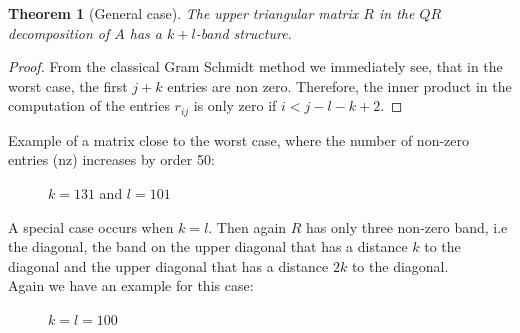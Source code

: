 \documentclass{report}
\numberwithin{pic}{section}
\numberwithin{lem}{section}
\newtheorem{thm}{Theorem}
\numberwithin{thm}{section}
\numberwithin{cor}{section}
\theoremstyle{definition}
\numberwithin{ex}{section}
\numberwithin{defn}{section}
\theoremstyle{definition}
\theoremstyle{remark}
\begin{document}
\begin{thm}[General case]
The upper triangular matrix $R$ in the $QR$ decomposition of $A$ has a $k+l$-band structure.
\end{thm}
\begin{proof}
From the classical Gram Schmidt method we immediately see, that in the worst case, the first $j+k$ entries are non zero.
Therefore, the inner product in the computation of the entries $r_{ij}$ is only zero if $i<j-l-k+2$. 
\end{proof}
Example of a matrix close to the worst case, where the number of non-zero entries (nz) increases by order 50:
\begin{figure}[H] 

    \caption{$k=131$ and $l=101$}
\end{figure} 
A special case occurs when $k=l$. Then again $R$ has only three non-zero band, i.e the diagonal, the band on the upper diagonal that has a distance $k$ to the diagonal and the upper diagonal that has a distance $2k$ to the diagonal.\\
Again we have an example for this case:
\begin{figure}[H] 

    \caption{$k=l=100$ }
\end{figure} 
\end{document}
